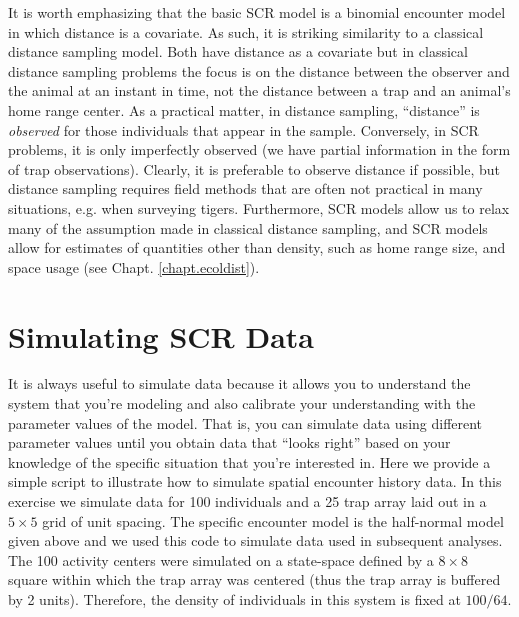 It is worth emphasizing that the basic SCR model is a binomial
encounter model in which distance is a covariate. As such, it is
striking similarity to a classical distance sampling model. Both have
distance as a covariate but in classical distance sampling problems
the focus is on the distance between the observer and the animal at an
instant in time, not the distance between a trap and an animal's home
range center. As a practical matter, in distance sampling, ``distance'' is {\it
  observed} for those individuals that appear in the
sample. Conversely, in SCR problems, it is only imperfectly observed
(we have partial information in the form of trap observations).
Clearly, it is preferable to observe distance if possible, but 
distance sampling requires field methods that
are often not practical in many situations, e.g. when surveying
tigers. Furthermore, SCR models allow us to relax many of the
assumption made in classical distance sampling, and SCR models allow
for estimates of quantities other than density, such as home range
size, and space usage (see Chapt. \ref{chapt.ecoldist}).


\section{Simulating SCR Data}

It is always useful to simulate data because it allows you to
understand the system that you're modeling and also calibrate your
understanding with the parameter values of the model. That is, you can
simulate data using different parameter values until you obtain data
that ``looks right'' based on your knowledge of the specific situation
that you're interested in. Here we provide a simple script to
illustrate how to simulate spatial encounter history data. In this
exercise we simulate data for 100 individuals and a 25 trap array laid
out in a $5 \times 5$ grid of unit spacing.  The specific encounter model is
the half-normal model given above and we used this code to simulate
data used in subsequent analyses.  The 100 activity centers were
simulated on a state-space defined by a $8 \times 8$ square within which the
trap array was centered (thus the trap array is buffered by 2
units). Therefore, the density of individuals in this system is fixed
at $100/64$.

